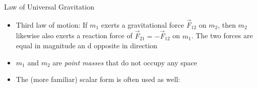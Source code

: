 \documentclass[12pt,compress,aspectratio=169]{beamer}
\begin{document}
\begin{frame}{Law of Universal Gravitation}
  \begin{center}
  \end{center}
  \begin{itemize}
  \item Third law of motion: If $m_1$ exerts a gravitational force $\vec F_{12}$
    on $m_2$, then $m_2$ likewise also exerts a reaction force of
    $\vec F_{21}=-\vec F_{12}$ on $m_1$. The two forces are equal in magnitude
    an d opposite in direction
  \item $m_1$ and $m_2$ are \emph{point masses} that do not occupy any space
  \item The (more familiar) scalar form is often used as well:

  \end{itemize}
\end{frame}
\end{document}
